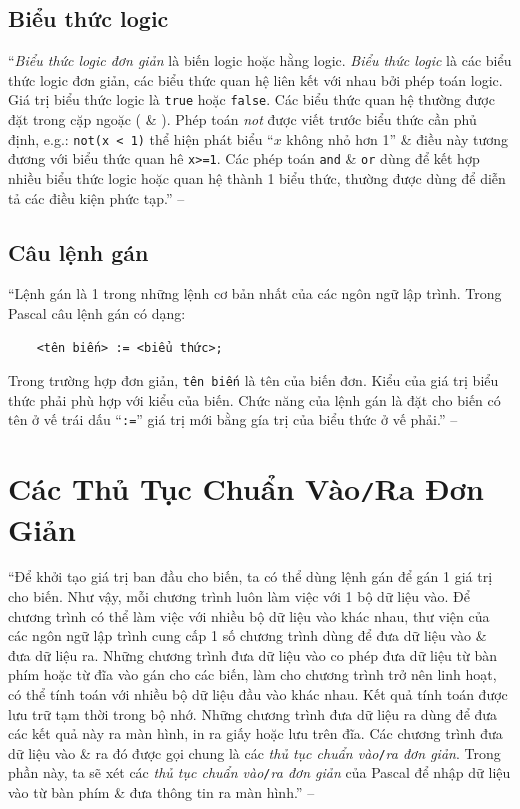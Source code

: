 \documentclass[oneside]{book}
\numberwithin{equation}{section}
\begin{document}
\subsection{Biểu thức logic}
``\textit{Biểu thức logic đơn giản} là biến logic hoặc hằng logic. \textit{Biểu thức logic} là các biểu thức logic đơn giản, các biểu thức quan hệ liên kết với nhau bởi phép toán logic. Giá trị biểu thức logic là \texttt{true} hoặc \texttt{false}. Các biểu thức quan hệ thường được đặt trong cặp ngoặc ( \& ). Phép toán \textit{not} được viết trước biểu thức cần phủ định, e.g.: \verb|not(x < 1)| thể hiện phát biểu ``$x$ không nhỏ hơn 1'' \& điều này tương đương với biểu thức quan hê \verb|x>=1|. Các phép toán \texttt{and} \& \texttt{or} dùng để kết hợp nhiều biểu thức logic hoặc quan hệ thành 1 biểu thức, thường được dùng để diễn tả các điều kiện phức tạp.'' -- \cite[p. 28]{SGK_Tin_Hoc_11}

\subsection{Câu lệnh gán}
``Lệnh gán là 1 trong những lệnh cơ bản nhất của các ngôn ngữ lập trình. Trong Pascal câu lệnh gán có dạng:
\begin{verbatim}
	<tên biến> := <biểu thức>;
\end{verbatim}
Trong trường hợp đơn giản, \texttt{tên biến} là tên của biến đơn. Kiểu của giá trị biểu thức phải phù hợp với kiểu của biến. Chức năng của lệnh gán là đặt cho biến có tên ở vế trái dấu ``\texttt{:=}'' giá trị mới bằng gía trị của biểu thức ở vế phải.'' -- \cite[p. 28]{SGK_Tin_Hoc_11}


\section{Các Thủ Tục Chuẩn Vào\texttt{/}Ra Đơn Giản}
``Để khởi tạo giá trị ban đầu cho biến, ta có thể dùng lệnh gán để gán 1 giá trị cho biến. Như vậy, mỗi chương trình luôn làm việc với 1 bộ dữ liệu vào. Để chương trình có thể làm việc với nhiều bộ dữ liệu vào khác nhau, thư viện của các ngôn ngữ lập trình cung cấp 1 số chương trình dùng để đưa dữ liệu vào \& đưa dữ liệu ra. Những chương trình đưa dữ liệu vào co phép đưa dữ liệu từ bàn phím hoặc từ đĩa vào gán cho các biến, làm cho chương trình trở nên linh hoạt, có thể tính toán với nhiều bộ dữ liệu đầu vào khác nhau. Kết quả tính toán được lưu trữ tạm thời trong bộ nhớ. Những chương trình đưa dữ liệu ra dùng để đưa các kết quả này ra màn hình, in ra giấy hoặc lưu trên đĩa. Các chương trình đưa dữ liệu vào \& ra đó được gọi chung là các \textit{thủ tục chuẩn vào}\texttt{/}\textit{ra đơn giản}. Trong phần này, ta sẽ xét các \textit{thủ tục chuẩn vào}\texttt{/}\textit{ra đơn giản} của Pascal để nhập dữ liệu vào từ bàn phím \& đưa thông tin ra màn hình.'' -- \cite[p. 29]{SGK_Tin_Hoc_11}
\end{document}
